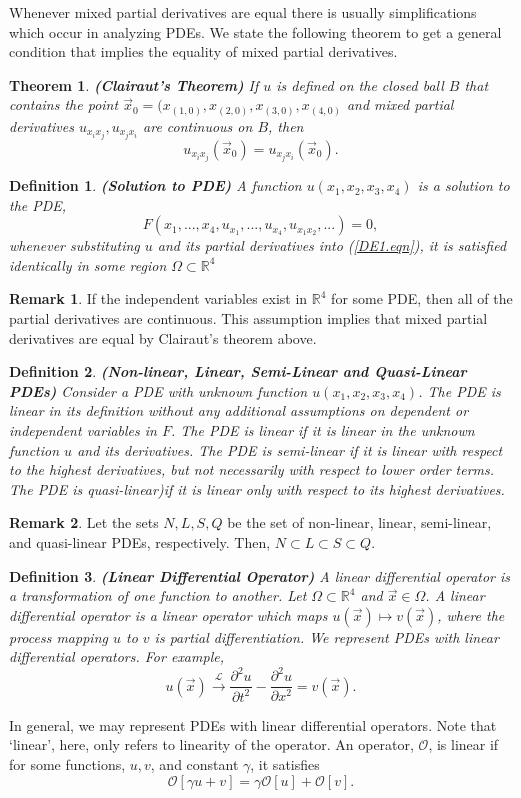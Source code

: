 \documentclass[12pt]{article}
\newtheorem{theorem}{Theorem}[section]
\newtheorem{definition}{Definition}[section]
\theoremstyle{definition}
\newtheorem*{remark}{Remark}
\numberwithin{equation}{section}
\begin{document}
{Whenever mixed partial derivatives are equal there is usually simplifications which occur in analyzing PDEs. We state the following theorem to get a general condition that implies the equality of mixed partial derivatives.
\begin{theorem}\textbf{(Clairaut's Theorem)}
If $u$ is defined on the closed ball $B$ that contains the point $\vec{x}_0=(x_{(1,0)},x_{(2,0)},x_{(3,0)},x_{(4,0)}$ and mixed partial derivatives $u_{x_ix_j},u_{x_jx_i}$ are continuous on $B$, then
$$u_{x_ix_j}(\vec{x}_0)=u_{x_jx_i}(\vec{x}_0).$$
\end{theorem}
\begin{definition}\textbf{(Solution to PDE)}
A function $u(x_1,x_2,x_3,x_4)$ is a solution to the PDE,
\begin{equation}
F(x_1,...,x_4,u_{x_1},...,u_{x_4},u_{x_1x_2},...)=0,
\label{DE1.eqn}
\end{equation}
whenever substituting $u$ and its partial derivatives into (\ref{DE1.eqn}), it is satisfied identically in some region $\Omega\subset\mathbb{R}^4$
\end{definition}
\begin{remark}
If the independent variables exist in $\mathbb{R}^4$ for some PDE, then all of the partial derivatives are continuous. This assumption implies that mixed partial derivatives are equal by Clairaut's theorem above.
\end{remark}
\begin{definition}\textbf{(Non-linear, Linear, Semi-Linear and Quasi-Linear PDEs)}
Consider a PDE with unknown function $u(x_1,x_2,x_3,x_4)$. The PDE is linear in its definition without any additional assumptions on dependent or independent variables in $F$. The PDE is linear if it is linear in the unknown function $u$ and its derivatives. The PDE is \it{semi-linear} if it is linear with respect to the highest derivatives, but not necessarily with respect to lower order terms. The PDE is \it{quasi-linear})if it is linear only with respect to its highest derivatives.
\end{definition}
\begin{remark}
Let the sets $N,L,S,Q$ be the set of non-linear, linear, semi-linear, and quasi-linear PDEs, respectively. Then, $N\subset L\subset S\subset Q$.
\end{remark}
\begin{definition}\textbf{(Linear Differential Operator)}
A linear differential operator is a transformation of one function to another. Let $\Omega\subset\mathbb{R}^4$ and $\vec{x}\in\Omega$. A linear differential operator is a linear operator which maps $u(\vec{x})\longmapsto v(\vec{x})$, where the process mapping $u$ to $v$ is partial differentiation. We represent PDEs with linear differential operators. For example,
$$u(\vec{x})\overset{\mathcal{L}}{\longrightarrow}\frac{\partial^2u}{\partial t^2}-\frac{\partial^2u}{\partial x^2}=v(\vec{x}).$$
\end{definition}
In general, we may represent PDEs with linear differential operators. Note that `linear', here, only refers to linearity of the operator. An operator, $\mathcal{O}$, is linear if for some functions, $u,v$, and constant $\gamma$, it satisfies
$$\mathcal{O}[\gamma u+v]=\gamma\mathcal{O}[u]+\mathcal{O}[v].$$

}
\end{document}
